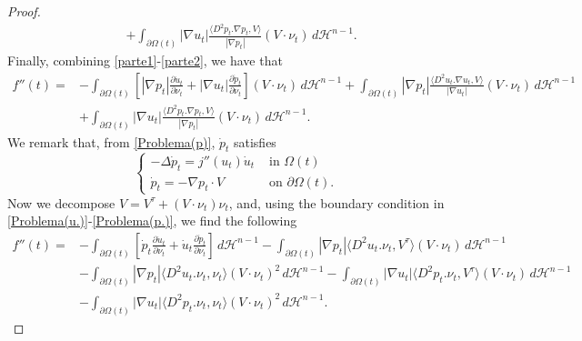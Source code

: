 \documentclass[oneside,a4paper,11pt,notitlepage]{article}
\newcommand{\abs}[1]{{\left|#1\right|}}
\theoremstyle{definition}
\theoremstyle{plain}
\theoremstyle{definition}
\begin{document}
\begin{proof}
\begin{equation}
\begin{split}
        &+\int_{\partial\Omega(t)}\abs{\nabla u_t}\frac{\langle D^2p_t.\nabla p_t, V\rangle}{\abs{\nabla p_t}}(V\cdot\nu_t)\,d\mathcal{H}^{n-1}.
    \end{split}
\end{equation}
Finally, combining \eqref{parte1}-\eqref{parte2}, we have that
\begin{equation*}
    \begin{split}
        f''(t)=&-\int_{\partial\Omega(t)}\left[\abs{\nabla p_t}\frac{\partial\dot{u}_t}{\partial\nu_t}+\abs{\nabla u_t}\frac{\partial\dot{p}_t}{\partial\nu_t} \right](V\cdot\nu_t)\,d\mathcal{H}^{n-1}+\int_{\partial\Omega(t)}\abs{\nabla p_t}\frac{\langle D^2u_t.\nabla u_t, V\rangle}{\abs{\nabla u_t}}(V\cdot\nu_t)\,d\mathcal{H}^{n-1}\\
        &+\int_{\partial\Omega(t)}\abs{\nabla u_t}\frac{\langle D^2p_t.\nabla p_t, V\rangle}{\abs{\nabla p_t}}(V\cdot\nu_t)\,d\mathcal{H}^{n-1}.
    \end{split}
\end{equation*}
We remark that, from \eqref{Problema(p)}, $\dot{p}_t$ satisfies
\begin{equation}\label{Problema(p.)}
    \begin{cases}
        -\Delta \dot{p}_t=j''(u_t)\dot{u}_t & \text{ in }\Omega(t)\\
        \dot{p}_t=-\nabla p_t\cdot V & \text{ on } \partial\Omega(t).
    \end{cases}
\end{equation}
Now we decompose $V=V^\tau+(V\cdot\nu_t)\nu_t$, and, using the boundary condition in \eqref{Problema(u.)}-\eqref{Problema(p.)}, we find the following
\begin{equation}\label{dersec(2)}
    \begin{split}
        f''(t)=&-\int_{\partial\Omega(t)}\left[\dot{p}_t\frac{\partial\dot{u}_t}{\partial\nu_t}+\dot{u}_t\frac{\partial\dot{p}_t}{\partial\nu_t} \right]\,d\mathcal{H}^{n-1}-\int_{\partial\Omega(t)}\abs{\nabla p_t}\langle D^2u_t.\nu_t,V^\tau\rangle(V\cdot\nu_t)\,d\mathcal{H}^{n-1}\\
        &-\int_{\partial\Omega(t)}\abs{\nabla p_t}\langle D^2u_t.\nu_t,\nu_t\rangle(V\cdot\nu_t)^2\,d\mathcal{H}^{n-1}-\int_{\partial\Omega(t)}\abs{\nabla u_t}\langle D^2p_t.\nu_t,V^\tau\rangle(V\cdot\nu_t)\,d\mathcal{H}^{n-1}\\
        &-\int_{\partial\Omega(t)}\abs{\nabla u_t}\langle D^2p_t.\nu_t,\nu_t\rangle(V\cdot\nu_t)^2\,d\mathcal{H}^{n-1}.
    \end{split}

\end{equation}
\end{proof}
\end{document}
